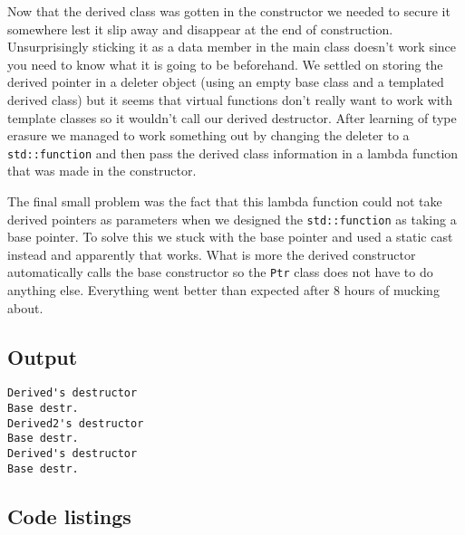 \documentclass[11pt]{article}
\begin{document}
Now that the derived class was gotten in the constructor we needed to secure it somewhere lest it slip away and disappear at the end of construction.
Unsurprisingly sticking it as a data member in the main class doesn't work since you need to know what it is going to be beforehand.
We settled on storing the derived pointer in a deleter object (using an empty base class and a templated derived class) but it seems that virtual functions don't really want to work with template classes so it wouldn't call our derived destructor.
After learning of type erasure we managed to work something out by changing the deleter to a \texttt{std::function} and then pass the derived class information in a lambda function that was made in the constructor.

The final small problem was the fact that this lambda function could not take derived pointers as parameters when we designed the \texttt{std::function} as taking a base pointer.
To solve this we stuck with the base pointer and used a static cast instead and apparently that works.
What is more the derived constructor automatically calls the base constructor so the \texttt{Ptr} class does not have to do anything else.
Everything went better than expected after 8 hours of mucking about.

\subsection*{Output}
\begin{lstlisting}
Derived's destructor
Base destr.
Derived2's destructor
Base destr.
Derived's destructor
Base destr.
\end{lstlisting}

\subsection*{Code listings}


\end{document}

